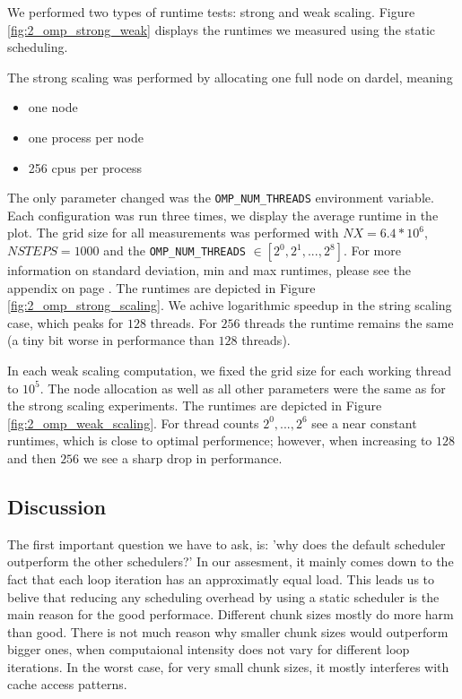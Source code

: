 \documentclass[a4paper,10pt]{article}
\begin{document}
We performed two types of runtime tests: strong and weak scaling.
Figure \ref{fig:2_omp_strong_weak} displays the runtimes we measured using the static scheduling.

The strong scaling was performed by allocating one full node on dardel, meaning
\begin{itemize}
\item one node
\item one process per node
\item 256 cpus per process
\end{itemize}
The only parameter changed was the \verb|OMP_NUM_THREADS| environment variable.
Each configuration was run three times, we display the average runtime in the plot.
The grid size for all measurements was performed with $NX = 6.4 * 10^6$, $NSTEPS = 1000$ and the \verb|OMP_NUM_THREADS| $\in [2^0, 2^1, ..., 2^8]$.
For more information on standard deviation, min and max runtimes, please see the appendix on page \pageref{sec:app:statistics}.
The runtimes are depicted in Figure \ref{fig:2_omp_strong_scaling}.
We achive logarithmic speedup in the string scaling case, which peaks for $128$ threads.
For $256$ threads the runtime remains the same (a tiny bit worse in performance than $128$ threads).

In each weak scaling computation, we fixed the grid size for each working thread to $10^5$.
The node allocation as well as all other parameters were the same as for the strong scaling experiments.
The runtimes are depicted in Figure \ref{fig:2_omp_weak_scaling}.
For thread counts $2^0, ..., 2^6$ see a near constant runtimes, which is close to optimal performence; however, when increasing to $128$ and then $256$ we see a sharp drop in performance.

\subsection{Discussion}
The first important question we have to ask, is: 'why does the default scheduler outperform the other schedulers?'
In our assesment, it mainly comes down to the fact that each loop iteration has an approximatly equal load.
This leads us to belive that reducing any scheduling overhead by using a static scheduler is the main reason for the good performace.
Different chunk sizes mostly do more harm than good.
There is not much reason why smaller chunk sizes would outperform bigger ones, when computaional intensity does not vary for different loop iterations.
In the worst case, for very small chunk sizes, it mostly interferes with cache access patterns.
\end{document}
